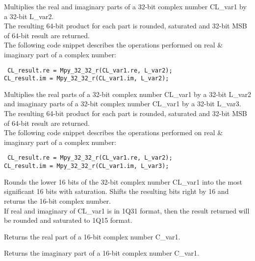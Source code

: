 
Multiplies the real and imaginary parts of a 32-bit complex number CL\_var1 by a 32-bit L\_var2.\\
The resulting 64-bit product for each part is rounded, saturated and 32-bit MSB of 64-bit result are returned.\\
The following code snippet describes the operations performed on real \& imaginary part of a complex number:

{\tt {} CL\_result.re = Mpy\_32\_32\_r(CL\_var1.re, L\_var2);\\
 CL\_result.im = Mpy\_32\_32\_r(CL\_var1.im, L\_var2);
}


Multiplies the real parts of a 32-bit complex number CL\_var1 by a 32-bit L\_var2 and imaginary parts of a 32-bit complex number CL\_var1 by a 32-bit L\_var3.
The resulting 64-bit product for each part is rounded, saturated and 32-bit MSB of 64-bit result are returned.\\
The following code snippet describes the operations performed on real \& imaginary part of a complex number:

{\tt {} CL\_result.re = Mpy\_32\_32\_r(CL\_var1.re, L\_var2);\\
 CL\_result.im = Mpy\_32\_32\_r(CL\_var1.im, L\_var3);
}


Rounds the lower 16 bits of the 32-bit complex number CL\_var1 into the most significant 16 bits with saturation.
Shifts the resulting bits right by 16 and returns the 16-bit complex number.\\
If real and imaginary of CL\_var1 is in 1Q31 format, then the result returned will be rounded and saturated to 1Q15 format.


Returns the real part of a 16-bit complex number C\_var1.


Returns the imaginary part of a 16-bit complex number C\_var1.


